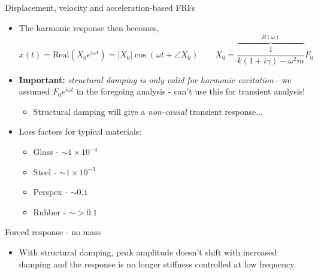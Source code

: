 \documentclass[11pt,aspectratio=169,handout]{beamer}
\begin{document}
\begin{frame}[c]{Displacement, velocity and acceleration-based FRFs}
	\begin{itemize}
		\item<1-> The harmonic response then becomes, 
		\begin{equation}
		x(t) = \mbox{Real}\left(X_0 e^{i\omega t} \right) = |X_0| \cos(\omega t+\angle X_0)  \quad \quad X_0 = \overbrace{\frac{1}{k(1+i\gamma)-\omega^2m}}^{R(\omega)}F_0
		\end{equation}
	\item<2-> \textbf{Important:} \textit{structural damping is only valid for harmonic excitation }- we assumed $F_0e^{i\omega t}$ in the foregoing analysis - can't use this for transient analysis!
	\begin{itemize}
		\item[-] Structural damping will give a \textit{non-causal} transient response...
	\end{itemize}
	\item<3->  Loss factors for typical materials:
	\begin{itemize}
		\item[-] Glass - $\sim 1\times10^{-4}$
		\item[-] Steel - $\sim 1\times10^{-3}$
		\item[-] Perspex - $\sim 0.1$
		\item[-] Rubber - $\sim >0.1$
	\end{itemize}
	\end{itemize}
\end{frame}

\begin{frame}[c]{Forced response - no mass}
	\begin{itemize}
		\item<1-> With structural damping, peak amplitude doesn't shift with increased damping and the response is no longer stiffness controlled at low frequency. 
	\end{itemize}
\vspace{0.3cm}
	\begin{figure}
		
	\end{figure}
\end{frame}
\end{document}
